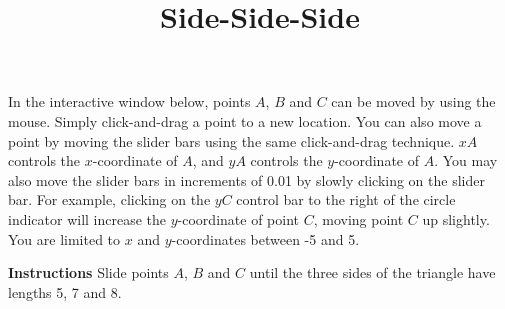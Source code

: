 \documentclass{ximera}
\title{Side-Side-Side}
\begin{document}
\begin{abstract}
\end{abstract}
\maketitle

In the interactive window below, points $A$, $B$ and $C$ can be moved by using the mouse. Simply click-and-drag a point to a new location. You can also move a point by moving the slider bars using the same click-and-drag technique. $xA$ controls the $x$-coordinate of $A$, and $yA$ controls the $y$-coordinate of $A$. You may also move the slider bars in increments of 0.01 by slowly clicking on the slider bar. For example, clicking on the $yC$ control bar to the right of the circle indicator will increase the $y$-coordinate of point $C$, moving point $C$ up slightly. You are limited to $x$ and $y$-coordinates between -5 and 5. 

{\bf {Instructions}} Slide points $A$, $B$ and $C$ until the three sides of the triangle have lengths 5, 7 and 8.


\end{document}
